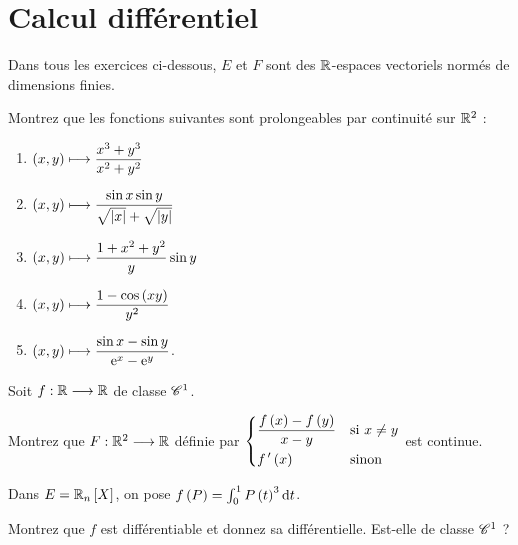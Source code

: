 \chapter{Calcul différentiel}

\minitoc

\legendeexercices

Dans tous les exercices ci-dessous, \(E\) et \(F\) sont des \(\mathbb{R}\)-espaces vectoriels normés de dimensions finies.

\begin{exoss}
Montrez que les fonctions suivantes sont prolongeables par continuité sur \(\mathbb{R}^2\) :

\begin{enumerate}
    \item \(\left(x,y\right)\longmapsto\dfrac{x^3+y^3}{x^2+y^2}\) \\
    \item \(\left(x,y\right)\longmapsto\dfrac{\sin x\sin y}{\sqrt{\left\lvert x\right\rvert}+\sqrt{\left\lvert y\right\rvert}}\) \\
    \item \(\left(x,y\right)\longmapsto\dfrac{1+x^2+y^2}{y}\sin y\) \\
    \item \(\left(x,y\right)\longmapsto\dfrac{1-\cos\left(xy\right)}{y^2}\) \\
    \item \(\left(x,y\right)\longmapsto\dfrac{\sin x-\sin y}{\mathrm{e}^{x}-\mathrm{e}^{y}}\).
\end{enumerate}
\end{exoss}

\begin{exoss}
Soit \(f:\mathbb{R}\longrightarrow\mathbb{R}\) de classe \(\mathscr{C}^{1}\).

Montrez que \(F:\mathbb{R}^2\longrightarrow\mathbb{R}\) définie par \(\begin{dcases}
\dfrac{f\left(x\right)-f\left(y\right)}{x-y} &\text{si }x\not=y \\
f^{\,\prime}\left(x\right) &\text{sinon}
\end{dcases}\) est continue.
\end{exoss}

\begin{exoss}
Dans \(E=\polydeg[\R]{n}\), on pose \(f\paren{P}=\int_0^1P\paren{t}^3\odif{t}\).

Montrez que \(f\) est différentiable et donnez sa différentielle. Est-elle de classe \(\mathscr{C}^{1}\) ?
\end{exoss}

